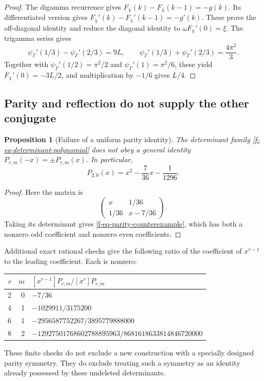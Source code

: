 \documentclass[11pt,a4paper]{article}
\newtheorem{proposition}[theorem]{Proposition}
\theoremstyle{definition}
\theoremstyle{remark}
\begin{document}
\begin{proof}
The digamma recurrence gives
$F_\chi(k)-F_\chi(k-1)=-g(k)$.  Its differentiated version gives
$F_\chi'(k)-F_\chi'(k-1)=-g'(k)$.  These prove the off-diagonal
identity and reduce the diagonal identity to
$\omega F_\chi'(0)=\xi$.
The trigamma series gives
\[
 \psi_\Gamma'(1/3)-\psi_\Gamma'(2/3)=9L,
 \qquad
 \psi_\Gamma'(1/3)+\psi_\Gamma'(2/3)=\frac{4\pi^2}{3}.
\]
Together with $\psi_\Gamma'(1/2)=\pi^2/2$ and
$\psi_\Gamma'(1)=\pi^2/6$, these yield
$F_\chi'(0)=-3L/2$, and multiplication by $-1/6$ gives $L/4$.
\end{proof}

\subsection{Parity and reflection do not supply the other conjugate}
\label{f-sub-parity}

\begin{proposition}[Failure of a uniform parity identity]
\label{f-prop-no-parity}
The determinant family \eqref{f-eq-determinant-polynomial} does not obey
a general identity $P_{r,m}(-x)=\pm P_{r,m}(x)$.  In particular,
\begin{equation}
 P_{2,0}(x)=x^2-\frac7{36}x-\frac1{1296}.
 \label{f-eq-parity-counterexample}
\end{equation}
\end{proposition}

\begin{proof}
Here the matrix is
\[
 \begin{pmatrix}x&1/36\\1/36&x-7/36\end{pmatrix}.
\]
Taking its determinant gives \eqref{f-eq-parity-counterexample}, which
has both a nonzero odd coefficient and nonzero even coefficients.
\end{proof}

Additional exact rational checks give the following ratio of the
coefficient of $x^{r-1}$ to the leading coefficient.  Each is nonzero:
\begin{center}
\begin{tabular}{r r l}
\hline
$r$&$m$&$[x^{r-1}]P_{r,m}/[x^r]P_{r,m}$\\
\hline
2&0&$-7/36$\\
4&1&$-1029911/3175200$\\
6&1&$-2956587752267/3895779888000$\\
8&2&$-12927501768602788895963/8681618633814846720000$\\
\hline
\end{tabular}
\end{center}
These finite checks do not exclude a new construction with a specially
designed parity symmetry.  They do exclude treating such a symmetry as an
identity already possessed by these undeleted determinants.
\end{document}
